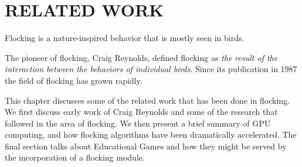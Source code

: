 \chapter{RELATED WORK}\label{chap2}


Flocking is a nature-inspired behavior that is mostly seen in birds. 

The pioneer of flocking, Craig Reynolds, defined flocking as \textit{the result of the interaction between the behaviors of individual birds}\cite{craig1}. Since its publication in 1987 the field of flocking has grown rapidly. %

This chapter discusses some of the related work that has been done in flocking.  We first discuss early work of Craig Reynolds and some of the research that followed in the area of flocking. We then present a brief summary of GPU computing, and how flocking algorithms have been dramatically accelerated.   The final section talks about Educational Games and how they might be served by the incorporation of a flocking module.  






